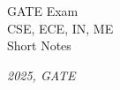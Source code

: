 \documentclass[a4paper,12pt,oneside]{book}
\begin{document}
\begin{titlepage}
\raggedright
{\Large GATE Exam\\[8cm]}
{\Huge\scshape CSE, ECE, IN, ME\\[.1in]}
{\Large Short Notes\\[1cm]}
\vfill

{\itshape 2025, GATE}
\end{titlepage}

\tableofcontents



\end{document}
